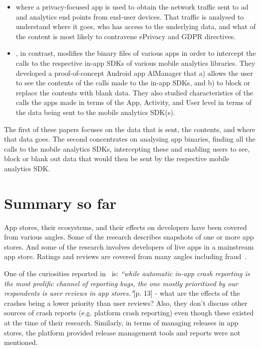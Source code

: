 \begin{itemize}
        \item \textcite{razaghpanah2018_apps_trackers_privacy_and_regulators_a_global_study_of_the_mobile_tracking_ecosystem} where a privacy-focused app is used to obtain the network traffic sent to ad and analytics end points from end-user devices. That traffic is analysed to understand where it goes, who has access to the underlying data, and what of the content is most likely to contravene ePrivacy and GDPR directives.
        \item \textcite{liu2020_privacy_risk_analysis_and_mitigation_of_analytics_libraries_in_the_android_ecosystem}, in contrast, modifies the binary files of various apps in order to intercept the calls to the respective in-app SDKs of various mobile analytics libraries. They developed a proof-of-concept Android app AlManager that a) allows the user to see the contents of the calls made to the in-app SDKs, and b) to block or replace the contents with blank data. They also studied characteristics of the calls the apps made in terms of the App, Activity, and User level in terms of the data being sent to the mobile analytics SDK(s).
\end{itemize}

The first of these papers focuses on the data that is sent, the contents, and where that data goes. The second concentrates on analysing app binaries, finding all the calls to the mobile analytics SDKs, intercepting these and enabling users to see, block or blank out data that would then be sent by the respective mobile analytics SDK.



\section{Summary so far} %
App stores, their ecosystems, and their effects on developers have been covered from various angles. Some of the research describes snapshots of one or more app stores. And some of the research involves developers of live apps in a mainstream app store. Ratings and reviews are covered from many angles including fraud~. 

One of the curiosities reported in~\textcite{alsubaihin2019app_store_effects_on_software_engineering} is: \emph{``while automatic in-app crash reporting is the most prolific channel of reporting bugs, the one mostly prioritised by our respondents is user reviews in app stores."}[p. 13] - what are the effects of the crashes being a lower priority than user reviews? Also, they don't discuss other sources of crash reports (e.g. platform crash reporting) even though these existed at the time of their research.
%
Similarly, in terms of managing releases in app stores, the platform provided release management tools and reports were not mentioned. 

